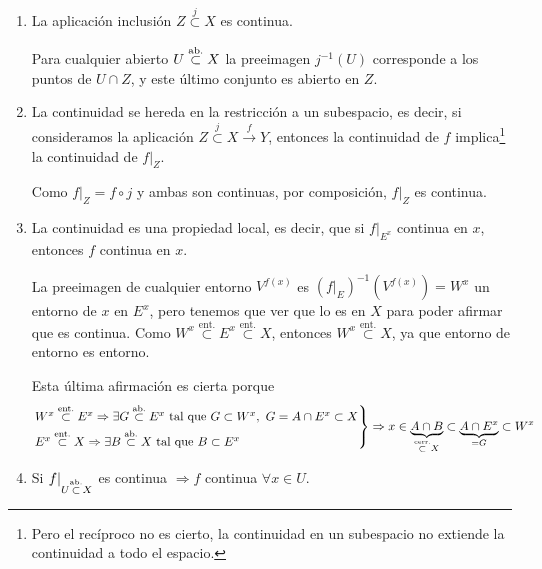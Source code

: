 \begin{obs}
\begin{enumerate}
    \item La aplicación inclusión $Z \stackrel{j}{\subset} X$ es continua.
    \begin{demo}
     Para cualquier abierto $U \stackrel{\text{ab.}}{\subset} X$ la preeimagen $j^{-1}\left( U \right)$ corresponde a los puntos de $U \cap Z$, y este último conjunto es abierto en $Z$.
    \end{demo}

    \item La continuidad se hereda en la restricción a un subespacio, es decir, si consideramos la aplicación $Z \stackrel{j}{\subset} X \xrightarrow{f} Y$, entonces la continuidad de $f$ implica\footnote{Pero el recíproco no es cierto, la continuidad en un subespacio no extiende la continuidad a todo el espacio.} la continuidad de $f|_Z$.
    \begin{demo}
    Como $f|_Z = f \circ j$ y ambas son continuas, por composición, $f|_Z$ es continua.
    \end{demo}

    \item La continuidad es una propiedad local, es decir, que si $f|_{E^x}$ continua en $x$, entonces $f$ continua en $x$.
    \begin{demo}
	La preeimagen de cualquier entorno $V^{f\left( x \right)}$ es $\left( f|_{E} \right)^{-1} \left( V^{f\left( x \right)} \right) = W^x$ un entorno de $x$ en $E^x$, pero tenemos que ver que lo es en $X$ para poder afirmar que es continua.
	Como $W^x \stackrel{\text{ent.}}{\subset} E^x \stackrel{\text{ent.}}{\subset} X$, entonces $W^x \stackrel{\text{ent.}}{\subset}X$, ya que entorno de entorno es entorno.
	
	Esta última afirmación es cierta porque 
        \[
        \begin{rcases}
           	W^x \stackrel{\text{ent.}}{\subset} E^x \Rightarrow \exists G \stackrel{\text{ab.}}{\subset} E^x \mbox{ tal que }G \subset W^x, \ G = A \cap E^x \subset X\\ 
            E^x \stackrel{\text{ent.}}{\subset} X \Rightarrow \exists B \stackrel{\text{ab.}}{\subset} X \mbox{ tal que } B \subset E^x
        \end{rcases} \Rightarrow x \in \underbrace{A \cap B}_{\stackrel{\text{cerr.}}{\subset} X} \subset \underbrace{A \cap E^x}_{= G}  \subset W^x
        \]
    \end{demo}

    \item Si $f|_{U \stackrel{\text{ab.}}{\subset} X}$ es continua $\Rightarrow f$ continua $\forall x \in U$.


\end{enumerate}
\end{obs}
